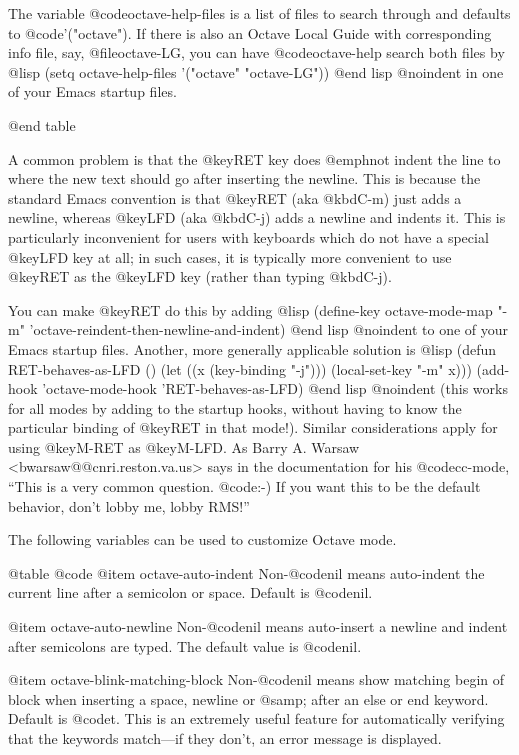 {{The variable @code{octave-help-files} is a list of files to search
through and defaults to @code{'("octave")}.  If there is also an Octave
Local Guide with corresponding info file, say, @file{octave-LG}, you can
have @code{octave-help} search both files by 
@lisp
(setq octave-help-files '("octave" "octave-LG"))
@end lisp
@noindent
in one of your Emacs startup files.

@end table

A common problem is that the @key{RET} key does @emph{not} indent the
line to where the new text should go after inserting the newline.  This
is because the standard Emacs convention is that @key{RET} (aka
@kbd{C-m}) just adds a newline, whereas @key{LFD} (aka @kbd{C-j}) adds a
newline and indents it.  This is particularly inconvenient for users with
keyboards which do not have a special @key{LFD} key at all;  in such
cases, it is typically more convenient to use @key{RET} as the @key{LFD}
key (rather than typing @kbd{C-j}).  

You can make @key{RET} do this by adding
@lisp
(define-key octave-mode-map "\C-m"
  'octave-reindent-then-newline-and-indent)
@end lisp
@noindent
to one of your Emacs startup files.  Another, more generally applicable
solution is
@lisp
(defun RET-behaves-as-LFD ()
  (let ((x (key-binding "\C-j")))
    (local-set-key "\C-m" x)))
(add-hook 'octave-mode-hook 'RET-behaves-as-LFD)
@end lisp
@noindent
(this works for all modes by adding to the startup hooks, without having
to know the particular binding of @key{RET} in that mode!).  Similar
considerations apply for using @key{M-RET} as @key{M-LFD}.  As Barry
A. Warsaw <bwarsaw@@cnri.reston.va.us> says in the documentation for his
@code{cc-mode}, ``This is a very common question. @code{:-)} If you want
this to be the default behavior, don't lobby me, lobby RMS!''

The following variables can be used to customize Octave mode.

@table @code
@item octave-auto-indent
Non-@code{nil} means auto-indent the current line after a semicolon or
space.  Default is @code{nil}.

@item octave-auto-newline
Non-@code{nil} means auto-insert a newline and indent after semicolons
are typed.  The default value is @code{nil}.

@item octave-blink-matching-block
Non-@code{nil} means show matching begin of block when inserting a space,
newline or @samp{;} after an else or end keyword.  Default is @code{t}.
This is an extremely useful feature for automatically verifying that the
keywords match---if they don't, an error message is displayed.

}}
